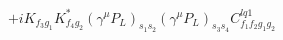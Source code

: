 %
\begin{dmath*}
%
  +  iK_{f_3 g_1} K_{f_4 g_2}^* (\gamma^{\mu} P_L)_{s_1 s_2} (\gamma^{\mu} P_L)_{s_3 s_4} C^{lq1}_{f_1 f_2 g_1 g_2}
%
\end{dmath*}
%
